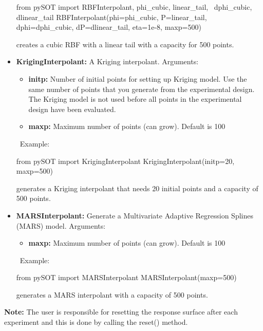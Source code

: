 \documentclass[]{article}
\begin{document}
\begin{itemize}
\begin{python}
from pySOT import RBFInterpolant, phi_cubic, linear_tail, \
	          dphi_cubic, dlinear_tail
RBFInterpolant(phi=phi_cubic, P=linear_tail, dphi=dphi_cubic, 
               dP=dlinear_tail, eta=1e-8, maxp=500)
\end{python}
creates a cubic RBF with a linear tail with a capacity for 500 points.
\item \textbf{KrigingInterpolant:} A Kriging interpolant. Arguments:
\begin{itemize}
\item \textbf{initp:} Number of initial points for setting up Kriging model. Use the same number of points that you generate from the experimental design. The Kriging model is not used before all points in the experimental design have been evaluated.
\item \textbf{maxp:} Maximum number of points (can grow). Default is 100
\end{itemize}
\ \newline Example:
\begin{python}
from pySOT import KrigingInterpolant
KrigingInterpolant(initp=20, maxp=500)
\end{python}
generates a Kriging interpolant that needs 20 initial points and a capacity of 500 points.
\item \textbf{MARSInterpolant:} Generate a Multivariate Adaptive Regression Splines (MARS) model. Arguments:
\begin{itemize}
\item \textbf{maxp:} Maximum number of points (can grow). Default is 100
\end{itemize}
\ \newline Example: 
\begin{python}
from pySOT import MARSInterpolant
MARSInterpolant(maxp=500)
\end{python}
generates a MARS interpolant with a capacity of 500 points.
\end{itemize}
\textbf{Note:} The user is responsible for resetting the response surface after each experiment and this is done by calling the reset() method.
\end{document}
